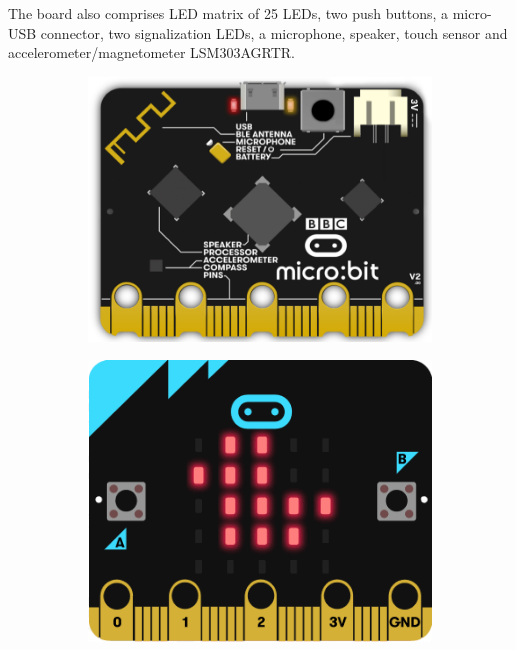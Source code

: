     The board also comprises LED matrix of 25 LEDs, two push buttons, a micro-USB connector, two signalization LEDs, a microphone, speaker, touch sensor and accelerometer/magnetometer LSM303AGRTR. 
    
        \begin{figure} [!ht]
            \centering
            \caption{BBC micro:bit.v2 (taken from \cite{image:BBC_microbit})}
            \begin{subfigure}[b]{0.48\textwidth}
                 \centering
                 \includegraphics[width=\textwidth]{02.HW/Figs/microbit.png}
             \end{subfigure}
             \hfill
            \begin{subfigure}[b]{0.45\textwidth}
                \includegraphics[width=\textwidth]{02.HW/Figs/microbit3.png}
            \end{subfigure}
        \end{figure}     
        

